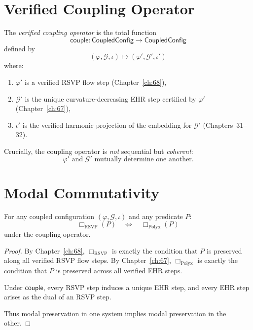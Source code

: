 \section{Verified Coupling Operator}

\begin{definition}
The \emph{verified coupling operator} is the total function
\[
\mathsf{couple}
  : \mathsf{CoupledConfig}
    \longrightarrow
    \mathsf{CoupledConfig}
\]
defined by
\[
(\varphi,\mathcal{G},\iota)
  \longmapsto
(\varphi',\mathcal{G}',\iota')
\]
where:
\begin{enumerate}
\item $\varphi'$ is a verified RSVP flow step 
      (Chapter~\ref{ch:68}),
\item $\mathcal{G}'$ is the unique curvature-decreasing EHR step 
      certified by $\varphi'$ (Chapter~\ref{ch:67}),
\item $\iota'$ is the verified harmonic projection of the embedding for 
      $\mathcal{G}'$ (Chapters~31--32).
\end{enumerate}
\end{definition}

Crucially, the coupling operator is \emph{not} sequential but \emph{coherent}:
\[
\varphi' \text{ and } \mathcal{G}' \text{ mutually determine one another.}
\]

\section{Modal Commutativity}

\begin{theorem}
\label{thm:69-modal-commute}
For any coupled configuration $(\varphi,\mathcal{G},\iota)$ and any predicate $P$:
\[
\Box_{\mathrm{RSVP}}(P)
\quad\Longleftrightarrow\quad
\Box_{\mathrm{Polyx}}(P)
\]
under the coupling operator.
\end{theorem}

\begin{proof}
By Chapter~\ref{ch:68}, $\Box_{\mathrm{RSVP}}$ is exactly the condition that 
$P$ is preserved along all verified RSVP flow steps.
By Chapter~\ref{ch:67}, $\Box_{\mathrm{Polyx}}$ is exactly the condition that 
$P$ is preserved across all verified EHR steps.

Under $\mathsf{couple}$, every RSVP step induces a unique EHR step, and every 
EHR step arises as the dual of an RSVP step.

Thus modal preservation in one system implies modal preservation in the other.
\end{proof}

